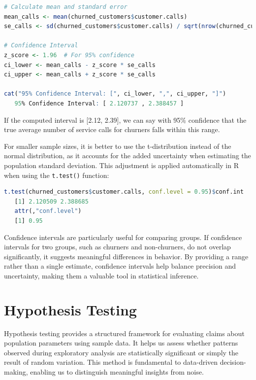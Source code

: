 \documentclass[
]{book}
\newcommand{\passthrough}[1]{#1}
\theoremstyle{definition}
\theoremstyle{definition}
\theoremstyle{definition}
\theoremstyle{definition}
\theoremstyle{remark}
\begin{document}
\begin{lstlisting}[language=R]
# Calculate mean and standard error
mean_calls <- mean(churned_customers$customer.calls)
se_calls <- sd(churned_customers$customer.calls) / sqrt(nrow(churned_customers))

# Confidence Interval
z_score <- 1.96  # For 95% confidence
ci_lower <- mean_calls - z_score * se_calls
ci_upper <- mean_calls + z_score * se_calls

cat("95% Confidence Interval: [", ci_lower, ",", ci_upper, "]")
   95% Confidence Interval: [ 2.120737 , 2.388457 ]
\end{lstlisting}

If the computed interval is {[}2.12, 2.39{]}, we can say with 95\% confidence that the true average number of service calls for churners falls within this range.

For smaller sample sizes, it is better to use the t-distribution instead of the normal distribution, as it accounts for the added uncertainty when estimating the population standard deviation. This adjustment is applied automatically in R when using the \passthrough{\lstinline!t.test()!} function:

\begin{lstlisting}[language=R]
t.test(churned_customers$customer.calls, conf.level = 0.95)$conf.int
   [1] 2.120509 2.388685
   attr(,"conf.level")
   [1] 0.95
\end{lstlisting}

Confidence intervals are particularly useful for comparing groups. If confidence intervals for two groups, such as churners and non-churners, do not overlap significantly, it suggests meaningful differences in behavior. By providing a range rather than a single estimate, confidence intervals help balance precision and uncertainty, making them a valuable tool in statistical inference.

\section{Hypothesis Testing}\label{hypothesis-testing}

Hypothesis testing provides a structured framework for evaluating claims about population parameters using sample data. It helps us assess whether patterns observed during exploratory analysis are statistically significant or simply the result of random variation. This method is fundamental to data-driven decision-making, enabling us to distinguish meaningful insights from noise.
\end{document}

